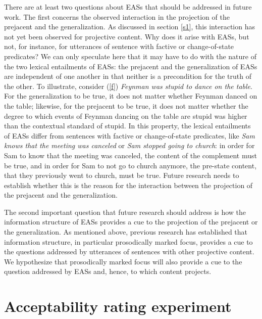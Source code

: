 \documentclass[11pt,fleqn]{article}
\newcommand{\6}{\mbox{$[\hspace*{-.6mm}[$}}
\newcommand{\9}{\mbox{$]\hspace*{-.6mm}]$}}
\begin{document}
There are at least two questions about EASs that should be addressed in future work. The first concerns the observed interaction in the projection of the prejacent and the generalization. As discussed in section \ref{s1}, this interaction has not yet been observed for projective content. Why does it arise with EASs, but not, for instance, for utterances of sentence with factive or change-of-state predicates? We can only speculate here that it may have to do with the nature of the two lexical entailments of EASs: the prejacent and the generalization of EASs are independent of one another in that neither is a precondition for the truth of the other. To illustrate, consider (\ref{f}) {\em Feynman was stupid to dance on the table}. For the generalization to be true, it does not matter whether Feynman danced on the table; likewise, for the prejacent to be true, it does not matter whether the degree to which events of Feynman dancing on the table are stupid was higher than the contextual standard of stupid. In this property, the lexical entailments of EASs differ from sentences with factive or change-of-state predicates, like {\em Sam knows that the meeting was canceled} or {\em Sam stopped going to church}: in order for Sam to know that the meeting was canceled, the content of the complement must be true, and in order for Sam to not go to church anymore, the pre-state content, that they previously went to church, must be true. Future research needs to establish whether this is the reason for the interaction between the projection of the prejacent and the generalization.

The second important question that future research should address is how the information structure of EASs provides a cue to the projection of the prejacent or the generalization. As mentioned above, previous research has established that information structure, in particular prosodically marked focus, provides a cue to the questions addressed by utterances of sentences with other projective content. We hypothesize that prosodically marked focus will also provide a cue to the question addressed by EASs and, hence, to which content projects. 


\appendix

\section{Acceptability rating experiment}\label{s-acc}
\end{document}
